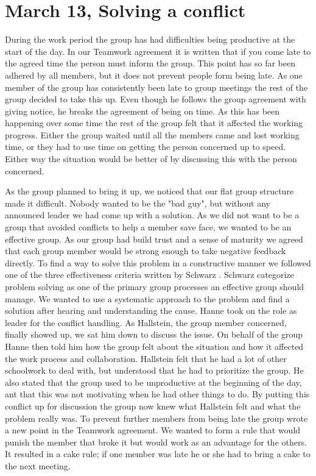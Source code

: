 \section{March 13, Solving a conflict}

During the work period the group has had difficulties being productive at the start of the day. In our Teamwork agreement it is written that if you come late to the agreed time the person must inform the group. This point has so far been adhered by all members, but it does not prevent people form being late. As one member of the group has consistently been late to group meetings the rest of the group decided to take this up. Even though he follows the group agreement with giving notice, he breaks the agreement of being on time. As this has been happening over some time the rest of the group felt that it affected the working progress. Either the group waited until all the members came and lost working time, or they had to use time on getting the person concerned up to speed. Either way the situation would be better of by discussing this with the person concerned.

As the group planned to bring it up, we noticed that our flat group structure made it difficult. Nobody wanted to be the "bad guy", but without any announced leader we had come up with a solution. As we did not want to be a group that avoided conflicts to help a member save face, we wanted to be an effective group. As our group had build trust and a sense of maturity we agreed that each group member would be strong enough to take negative feedback directly. To find a way to solve this problem in a constructive manner we followed one of the three effectiveness criteria written by Schwarz \cite{WorkGroups}. Schwarz \cite{WorkGroups} categorize problem solving as one of the primary group processes an effective group should manage. We wanted to use a systematic approach to the problem and find a solution after hearing and understanding the cause. Hanne took on the role as leader for the conflict handling. As Hallstein, the group member concerned, finally showed up, we sat him down to discuss the issue. On behalf of the group Hanne then told him how the group felt about the situation and how it affected the work process and collaboration. Hallstein felt that he had a lot of other schoolwork to deal with, but understood that he had to prioritize the group. He also stated that the group used to be unproductive at the beginning of the day, ant that this was not motivating when he had other things to do. By putting this conflict up for discussion the group now knew what Hallstein felt and what the problem really was. To prevent further members from being late the group wrote a new point in the Teamwork agreement. We wanted to form a rule that would punish the member that broke it but would work as an advantage for the others. It resulted in a cake rule; if one member was late he or she had to bring a cake to the next meeting. 

